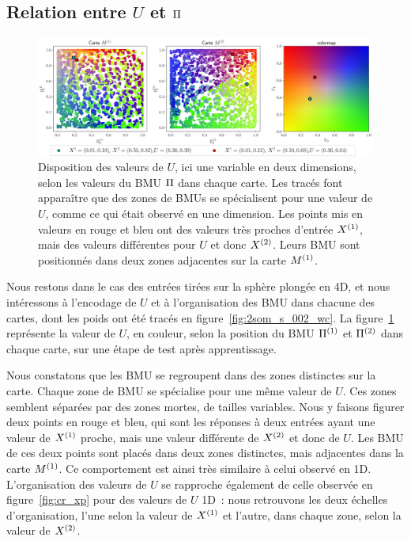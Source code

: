 \documentclass[../main]{subfiles}
\begin{document}
\subsection{Relation entre $U$ et $\Pi$ \label{par:U_bmu2D}}

\begin{figure}[t]
	\includegraphics[width=\textwidth]{U_BMU_2SOM_2D.png}
	\caption{Disposition des valeurs de $U$, ici une variable en deux dimensions, selon les valeurs du BMU $\Pi$ dans chaque carte. Les tracés font apparaître que des zones de BMUs se spécialisent pour une valeur de $U$, comme ce qui était observé en une dimension. Les points mis en valeurs en rouge et bleu ont des valeurs très proches d'entrée $X^{({1})}$, mais des valeurs différentes pour $U$ et donc $X^{({2})}$. Leurs BMU sont positionnés dans deux zones adjacentes sur la carte $M^{({1})}$.
	\label{fig:U_BMU}}
\end{figure}

Nous restons dans le cas des entrées tirées sur la sphère plongée en 4D, et nous intéressons à l'encodage de $U$ et à l'organisation des BMU dans chacune des cartes, dont les poids ont été tracés en figure~\ref{fig:2som_s_002_wc}.
La figure~\ref{fig:U_BMU} représente la valeur de $U$, en couleur, selon la position du BMU $\Pi^{({1})}$ et $\Pi^{({2})}$ dans chaque carte, sur une étape de test après apprentissage.

Nous constatons que les BMU se regroupent dans des zones distinctes sur la carte. Chaque zone de BMU se spécialise pour une même valeur de $U$. Ces zones semblent séparées par des zones mortes, de tailles variables.
Nous y faisons figurer deux points en rouge et bleu, qui sont les réponses à deux entrées ayant une valeur de $X^{({1})}$ proche, mais une valeur différente de $X^{({2})}$ et donc de $U$.
Les BMU de ces deux points sont placés dans deux zones distinctes, mais adjacentes dans la carte $M^{({1})}$. Ce comportement est ainsi très similaire à celui observé en 1D. 
L'organisation des valeurs de $U$ se rapproche également de celle observée en figure~\ref{fig:cr_xp} pour des valeurs de $U$ 1D~: nous retrouvons les deux échelles d'organisation, l'une selon la valeur de $X^{({1})}$ et l'autre, dans chaque zone, selon la valeur de $X^{({2})}$.
\end{document}

